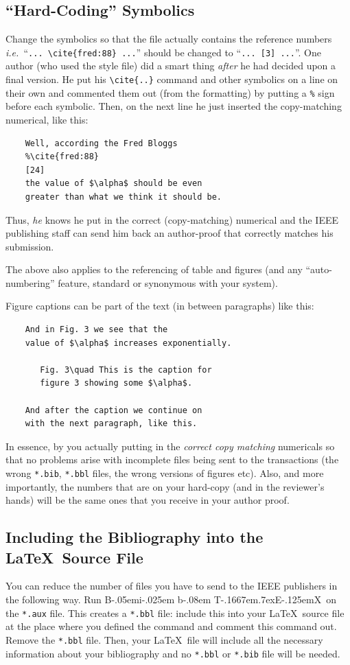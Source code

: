\documentclass[journal,transmag]{IEEEtran}
\def\BibTeX{{\rm B\kern-.05em{\sc i\kern-.025em b}\kern-.08em
    T\kern-.1667em\lower.7ex\hbox{E}\kern-.125emX}}
\begin{document}
\subsection{``Hard-Coding'' Symbolics}
Change the symbolics so that the file actually contains the reference
numbers
{\em i.e.\ \/}``\verb+... \cite{fred:88} ...+'' should be changed to
``\verb+... [3] ...+''. One author (who used the style file) did a smart
thing
{\em after\/} he had decided upon a final version.  He put his
\verb+\cite{..}+ command and other symbolics on a line on their own
and commented them out (from the formatting) by putting a \verb+%+
sign before each symbolic. Then, on the next line he just inserted the
copy-matching numerical, like this:

\begin{verbatim}
    Well, according the Fred Bloggs
    %\cite{fred:88}
    [24]
    the value of $\alpha$ should be even
    greater than what we think it should be.
\end{verbatim}

Thus, {\em he\/} knows he put in the correct (copy-matching) numerical and
the IEEE publishing staff can send him back an author-proof
that correctly matches his submission.

The above also applies to the referencing of table and figures
(and any ``auto-numbering'' feature, standard or synonymous with your
system).

Figure captions can be part of the text (in between paragraphs) like this:

\begin{verbatim}
    And in Fig. 3 we see that the
    value of $\alpha$ increases exponentially.

       Fig. 3\quad This is the caption for
       figure 3 showing some $\alpha$.

    And after the caption we continue on
    with the next paragraph, like this.
\end{verbatim}

In essence, by you actually putting in the {\em correct copy
matching\/} numericals so that no problems arise with incomplete files
being sent to the transactions (the wrong \verb+*.bib+, \verb+*.bbl+ files,
the wrong versions of figures etc).  Also, and more importantly, the
numbers that are on your hard-copy (and in the reviewer's hands) will
be the same ones that you receive in your author proof.

\subsection{Including the Bibliography into the \LaTeX\ Source File}
You can reduce the number of files you have to send to the IEEE
publishers in the following way. Run \BibTeX\ on the
\verb+*.aux+ file. This creates a \verb+*.bbl+ file: include this
into your \LaTeX\ source file at the place where you defined the
\verb++ command  and comment this command out.
Remove the \verb+*.bbl+ file.  Then, your \LaTeX\ file will include
all the necessary information about your bibliography and no \verb+*.bbl+
or \verb+*.bib+ file will be needed.
\end{document}
